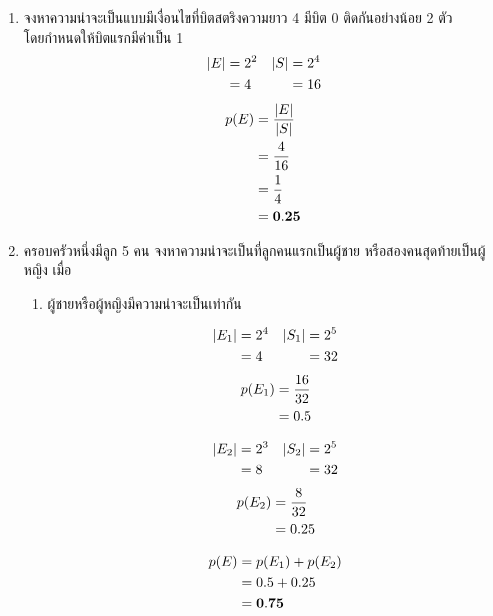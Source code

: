 \documentclass{article}
\begin{document}
\begin{enumerate}
\pagebreak

\item{จงหาความน่าจะเป็นแบบมีเงื่อนไขที่บิตสตริงความยาว 4 มีบิต 0 ติดกันอย่างน้อย 2 ตัว \\
โดยกำหนดให้บิตแรกมีค่าเป็น 1}
\begin{align*}
|E| &= 2^2 & |S| &= 2^4 \notag \\
&= 4 & &= 16
\end{align*}
\begin{equation}
\begin{split}
p(E) &= \frac{|E|}{|S|} \notag \\
&= \frac{4}{16} \\
&= \frac{1}{4} \\
&= \mathbf{0.25}
\end{split}
\end{equation}

\item{ครอบครัวหนึ่งมีลูก 5 คน จงหาความน่าจะเป็นที่ลูกคนแรกเป็นผู้ชาย หรือสองคนสุดท้ายเป็นผู้หญิง เมื่อ}
	\begin{enumerate}
	
	\item{ผู้ชายหรือผู้หญิงมีความน่าจะเป็นเท่ากัน}
	\begin{multicols}{2}
	\begin{align*}
	|E_1| &= 2^4 & |S_1| &= 2^5 \notag \\
	&= 4 & &= 32
	\end{align*}
	\begin{equation}
	\begin{split}
	p(E_1) &= \frac{16}{32} \notag \\
	&= 0.5
	\end{split}
	\end{equation}

	\columnbreak

	\begin{align*}
	|E_2| &= 2^3 & |S_2| &= 2^5 \notag \\
	&= 8 & &= 32
	\end{align*}
	\begin{equation}
	\begin{split}
	p(E_2) &= \frac{8}{32} \notag \\
	&= 0.25
	\end{split}
	\end{equation}

	\end{multicols}

	\begin{equation}
	\begin{split}
	p(E) &= p(E_1) + p(E_2) \notag \\
	&= 0.5 + 0.25 \\
	&= \mathbf{0.75}
	\end{split}
	\end{equation}
	

\end{enumerate}
\end{enumerate}
\end{document}
